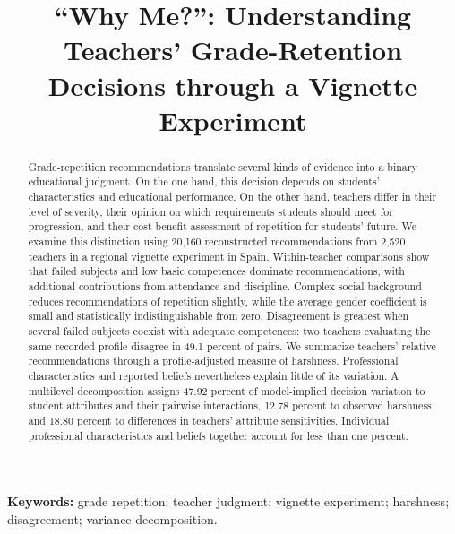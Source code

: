 
\title{“Why Me?”: Understanding Teachers’ Grade-Retention Decisions through a Vignette Experiment}
\author{\authors}

\maketitle
\color{reused}
\begin{abstract}
Grade-repetition recommendations translate several kinds of evidence into a binary educational judgment. On the one hand, this decision depends on students' characteristics and educational performance. On the other hand, teachers differ in their level of severity, their opinion on which requirements students should meet for progression, and their cost-benefit assessment of repetition for students' future. We examine this distinction using 20,160 reconstructed recommendations from 2,520 teachers in a regional vignette experiment in Spain. Within-teacher comparisons show that failed subjects and low basic competences dominate recommendations, with additional contributions from attendance and discipline. Complex social background reduces recommendations of repetition slightly, while the average gender coefficient is small and statistically indistinguishable from zero. Disagreement is greatest when several failed subjects coexist with adequate competences: two teachers evaluating the same recorded profile disagree in 49.1 percent of pairs. We summarize teachers' relative recommendations through a profile-adjusted measure of harshness. Professional characteristics and reported beliefs nevertheless explain little of its variation. A multilevel decomposition assigns 47.92 percent of model-implied decision variation to student attributes and their pairwise interactions, 12.78 percent to observed harshness and 18.80 percent to differences in teachers' attribute sensitivities. Individual professional characteristics and beliefs together account for less than one percent.
\end{abstract}
\noindent\textbf{Keywords:} grade repetition; teacher judgment; vignette experiment; harshness; disagreement; variance decomposition.

